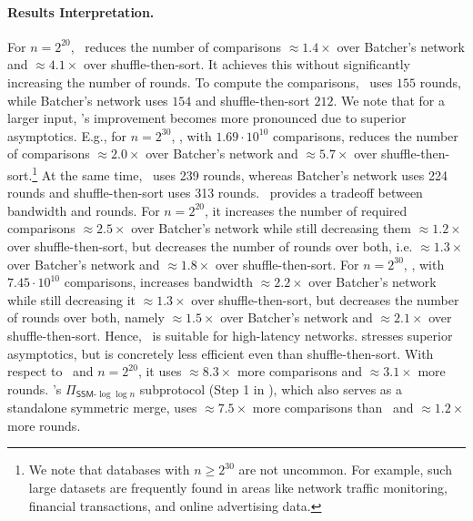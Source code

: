 \paragraph{ Results Interpretation.} For $n=2^{20}$, \ourprotocol\ reduces the number of comparisons $\approx 1.4\times$ over Batcher's network and $\approx4.1\times$ over shuffle-then-sort. It achieves this without significantly increasing the number of rounds. To compute the comparisons, \ourprotocol\ uses $155$ rounds, while Batcher's network uses $154$ and shuffle-then-sort $212$. We note that for a larger input, \ourprotocol's improvement becomes more pronounced due to superior asymptotics. E.g., for $n=2^{30}$, \ourprotocol, with $1.69\cdot10^{10}$ comparisons, reduces the number of comparisons $\approx 2.0\times$ over Batcher's network and $\approx5.7\times$ over shuffle-then-sort.\footnote{We note that databases with $n \geq 2^{30}$ are not uncommon. For example, such large datasets are frequently found in areas like network traffic monitoring, financial transactions, and online advertising data.} At the same time, \ourprotocol\ uses 239 rounds, whereas Batcher's network uses 224 rounds and shuffle-then-sort uses 313 rounds. \ourprotocoltwo\ provides a tradeoff between bandwidth and rounds. For $n = 2^{20}$, it increases the number of required comparisons $\approx 2.5\times$ over Batcher's network while still decreasing them $\approx 1.2\times$ over shuffle-then-sort, but decreases the number of rounds over both, i.e. $\approx 1.3\times$ over Batcher's network and $\approx 1.8\times$ over shuffle-then-sort. For $n=2^{30}$, \ourprotocoltwo, with $7.45\cdot10^{10}$ comparisons, increases bandwidth $\approx2.2\times$ over Batcher's network while still decreasing it $\approx1.3\times$ over shuffle-then-sort, but decreases the number of rounds over both, namely $\approx1.5\times$ over Batcher's network and $\approx2.1\times$ over shuffle-then-sort. Hence, \ourprotocoltwo\ is suitable for high-latency networks. \cite{EPRINT:BBDLO22} stresses superior asymptotics, but is concretely less efficient even than shuffle-then-sort. With respect to \ourprotocol\ and $n=2^{20}$, it uses $\approx8.3\times$ more comparisons and $\approx3.1\times$ more rounds. \cite{EPRINT:BBDLO22}'s $\Pi_{\textsf{SSM-}{\log}{\log} n}$ subprotocol (Step 1 in ), which also serves as a standalone symmetric merge, uses $\approx7.5\times$ more comparisons than \ourprotocol\ and $\approx1.2\times$ more rounds. \\ %

